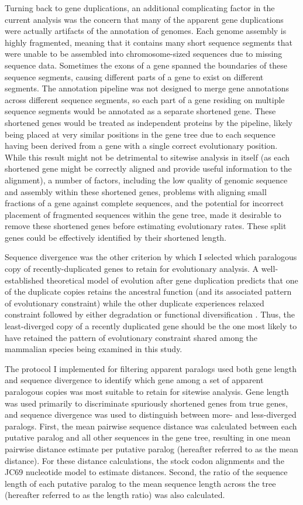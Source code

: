 Turning back to gene duplications, an additional complicating factor
in the current analysis was the concern that many of the apparent gene
duplications were actually artifacts of the annotation of \lcv
genomes. Each \lcv genome assembly is highly fragmented, meaning that
it contains many short sequence segments that were unable to be
assembled into chromosome-sized sequences due to missing sequence
data. Sometimes the exons of a gene spanned the boundaries of these
sequence segments, causing different parts of a gene to exist on
different segments. The \ens annotation pipeline was not designed to
merge gene annotations across different sequence segments, so each
part of a gene residing on multiple sequence segments would be
annotated as a separate shortened gene. These shortened genes would be
treated as independent proteins by the \cmp pipeline, likely being
placed at very similar positions in the gene tree due to each sequence
having been derived from a gene with a single correct evolutionary
position. While this result might not be detrimental to sitewise
analysis in itself (as each shortened gene might be correctly aligned
and provide useful information to the alignment), a number of factors,
including the low quality of genomic sequence and assembly within
these shortened genes, problems with aligning small fractions of a
gene against complete sequences, and the potential for incorrect
placement of fragmented sequences within the gene tree, made it
desirable to remove these shortened genes before estimating
evolutionary rates. These split genes could be effectively identified
by their shortened length.

Sequence divergence was the other criterion by which I selected which
paralogous copy of recently-duplicated genes to retain for
evolutionary analysis. A well-established theoretical model of
evolution after gene duplication predicts that one of the duplicate
copies retains the ancestral function (and its associated pattern of
evolutionary constraint) while the other duplicate experiences relaxed
constraint followed by either degradation or functional
diversification \citep{Han2009}. Thus, the least-diverged copy of a
recently duplicated gene should be the one most likely to have
retained the pattern of evolutionary constraint shared among the
mammalian species being examined in this study.

The protocol I implemented for filtering apparent paralogs used both
gene length and sequence divergence to identify which gene among a set
of apparent paralogous copies was most suitable to retain for sitewise
analysis. Gene length was used primarily to discriminate spuriously
shortened genes from true genes, and sequence divergence was used to
distinguish between more- and less-diverged paralogs. First, the mean
pairwise sequence distance was calculated between each putative
paralog and all other sequences in the gene tree, resulting in one
mean pairwise distance estimate per putative paralog (hereafter
referred to as the mean distance). For these distance calculations,
the stock \cmp codon alignments and the JC69 nucleotide model to
estimate distances. Second, the ratio of the sequence length of each
putative paralog to the mean sequence length across the tree
(hereafter referred to as the length ratio) was also calculated.

